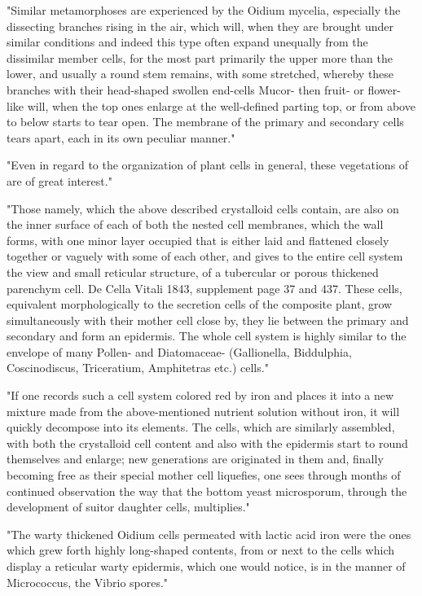 \documentclass[a4paper, 11pt, oneside]{article}
\begin{document}
"Similar metamorphoses are experienced by the Oidium mycelia, especially the dissecting branches rising in the air, which will, when they are brought under similar conditions and indeed this type often expand unequally from the dissimilar member cells, for the most part primarily the upper more than the lower, and usually a round stem remains, with some stretched, whereby these branches with their head-shaped swollen end-cells Mucor- then fruit- or flower-like will, when the top ones enlarge at the well-defined parting top, or from above to below starts to tear open. The membrane of the primary and secondary cells tears apart, each in its own peculiar manner."

"Even in regard to the organization of plant cells in general, these vegetations of are of great interest."

"Those namely, which the above described crystalloid cells contain, are also on the inner surface of each of both the nested cell membranes, which the wall forms, with one minor layer occupied that is either laid and flattened closely together or vaguely with some of each other, and gives to the entire cell system the view and small reticular structure, of a tubercular or porous thickened parenchym cell. De Cella Vitali 1843, supplement page 37 and 437. These cells, equivalent morphologically to the secretion cells of the composite plant, grow simultaneously with their mother cell close by, they lie between the primary and secondary and form an epidermis. The whole cell system is highly similar to the envelope of many Pollen- and Diatomaceae- (Gallionella, Biddulphia, Coscinodiscus, Triceratium, Amphitetras etc.) cells."

"If one records such a cell system colored red by iron and places it into a new mixture made from the above-mentioned nutrient solution without iron, it will quickly decompose into its elements. The cells, which are similarly assembled, with both the crystalloid cell content and also with the epidermis start to round themselves and enlarge; new generations are originated in them and, finally becoming free as their special mother cell liquefies, one sees through months of continued observation the way that the bottom yeast microsporum, through the development of suitor daughter cells, multiplies."

"The warty thickened Oidium cells permeated with lactic acid iron were the ones which grew forth highly long-shaped contents, from or next to the cells which display a reticular warty epidermis, which one would notice, is in the manner of Micrococcus, the Vibrio spores."
\end{document}
